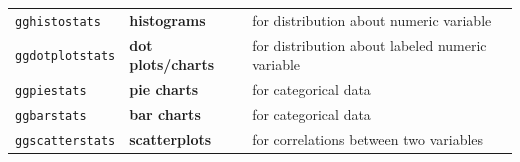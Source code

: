 \documentclass[]{article}
\begin{document}
\begin{longtable}[]{@{}lll@{}}
\begin{minipage}[t]{0.17\columnwidth}
\texttt{gghistostats}\strut
\end{minipage} & \begin{minipage}[t]{0.25\columnwidth}\raggedright
\textbf{histograms}\strut
\end{minipage} & \begin{minipage}[t]{0.49\columnwidth}\raggedright
for distribution about numeric variable\strut
\end{minipage}\tabularnewline
\begin{minipage}[t]{0.17\columnwidth}\raggedright
\texttt{ggdotplotstats}\strut
\end{minipage} & \begin{minipage}[t]{0.25\columnwidth}\raggedright
\textbf{dot plots/charts}\strut
\end{minipage} & \begin{minipage}[t]{0.49\columnwidth}\raggedright
for distribution about labeled numeric variable\strut
\end{minipage}\tabularnewline
\begin{minipage}[t]{0.17\columnwidth}\raggedright
\texttt{ggpiestats}\strut
\end{minipage} & \begin{minipage}[t]{0.25\columnwidth}\raggedright
\textbf{pie charts}\strut
\end{minipage} & \begin{minipage}[t]{0.49\columnwidth}\raggedright
for categorical data\strut
\end{minipage}\tabularnewline
\begin{minipage}[t]{0.17\columnwidth}\raggedright
\texttt{ggbarstats}\strut
\end{minipage} & \begin{minipage}[t]{0.25\columnwidth}\raggedright
\textbf{bar charts}\strut
\end{minipage} & \begin{minipage}[t]{0.49\columnwidth}\raggedright
for categorical data\strut
\end{minipage}\tabularnewline
\begin{minipage}[t]{0.17\columnwidth}\raggedright
\texttt{ggscatterstats}\strut
\end{minipage} & \begin{minipage}[t]{0.25\columnwidth}\raggedright
\textbf{scatterplots}\strut
\end{minipage} & \begin{minipage}[t]{0.49\columnwidth}\raggedright
for correlations between two variables\strut
\end{minipage}\tabularnewline

\end{longtable}
\end{document}
